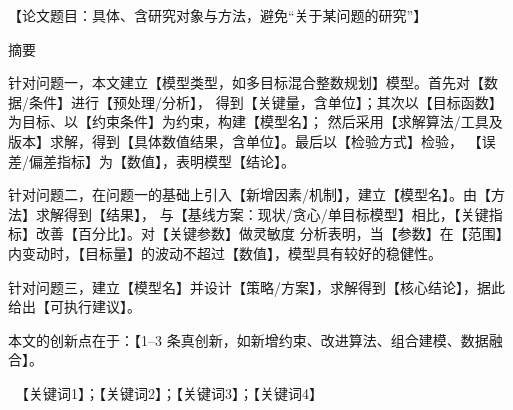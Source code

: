 \documentclass[12pt,a4paper,fontset=windows]{ctexart}
\begin{document}
\linespread{1.0}\selectfont   %

\begin{center}
  {\heiti 【论文题目：具体、含研究对象与方法，避免“关于某问题的研究”】}
\end{center}

\vspace{0.6em}
\begin{center}
  {\heiti 摘\quad 要}   %
\end{center}
\vspace{0.3em}

针对问题一，本文建立【模型类型，如多目标混合整数规划】模型。首先对【数据/条件】进行【预处理/分析】，
得到【关键量，含单位】；其次以【目标函数】为目标、以【约束条件】为约束，构建【模型名】；
然后采用【求解算法/工具及版本】求解，得到【具体数值结果，含单位】。最后以【检验方式】检验，
【误差/偏差指标】为【数值】，表明模型【结论】。

针对问题二，在问题一的基础上引入【新增因素/机制】，建立【模型名】。由【方法】求解得到【结果】，
与【基线方案：现状/贪心/单目标模型】相比，【关键指标】改善【百分比】。对【关键参数】做灵敏度
分析表明，当【参数】在【范围】内变动时，【目标量】的波动不超过【数值】，模型具有较好的稳健性。

针对问题三，建立【模型名】并设计【策略/方案】，求解得到【核心结论】，据此给出【可执行建议】。

本文的创新点在于：【1–3 条真创新，如新增约束、改进算法、组合建模、数据融合】。

\vspace{0.5em}
\ 【关键词1】；【关键词2】；【关键词3】；【关键词4】

\newpage
\end{document}
